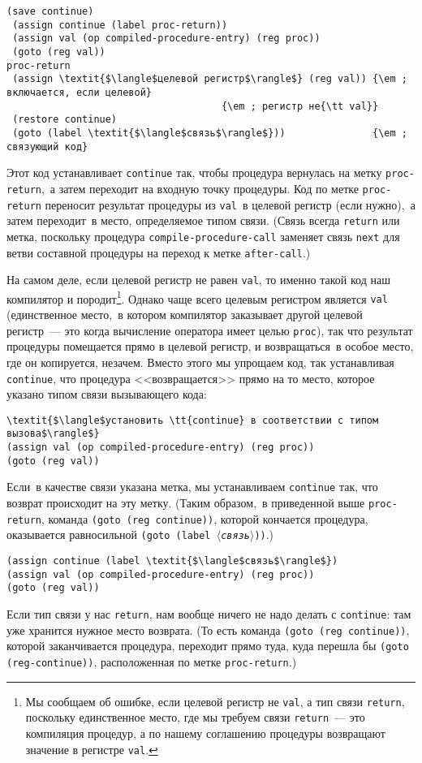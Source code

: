 \begin{Verbatim}[fontsize=\small]
 (save continue)
 (assign continue (label proc-return))
 (assign val (op compiled-procedure-entry) (reg proc))
 (goto (reg val))
proc-return
 (assign \textit{$\langle$целевой регистр$\rangle$} (reg val)) {\em ; включается, если целевой} 
                                     {\em ; регистр не{\tt val}}
 (restore continue)
 (goto (label \textit{$\langle$связь$\rangle$}))               {\em ; связующий код}
\end{Verbatim}
Этот код устанавливает {\tt continue} так, чтобы процедура
вернулась на метку {\tt proc-return},~а затем переходит на
входную точку процедуры.  Код по метке {\tt proc-return}
переносит результат процедуры из {\tt val}~в целевой регистр
(если нужно),~а затем переходит~в место, определяемое типом связи.
(Связь всегда {\tt return} или метка, поскольку процедура
{\tt compile-procedure-call} заменяет связь {\tt next}
для ветви составной процедуры на переход к метке
{\tt after-call}.)

На самом деле, если целевой регистр не равен
{\tt val}, то именно такой код наш компилятор и
породит\footnote{Мы сообщаем об ошибке, если целевой регистр не
{\tt val}, а тип связи {\tt return}, поскольку
единственное место, где мы требуем связи {\tt return}~--- это
компиляция процедур, а по нашему соглашению процедуры возвращают
значение в регистре {\tt val}.
}.
Однако чаще всего целевым регистром является {\tt val}
(единственное место,~в котором компилятор заказывает другой целевой
регистр~--- это когда вычисление оператора имеет целью
{\tt proc}), так что результат процедуры помещается прямо в
целевой регистр, и возвращаться~в особое место, где он копируется,
незачем.  Вместо этого мы упрощаем код, так устанавливая
{\tt continue}, что процедура <<возвращается>> прямо на то
место, которое указано типом связи вызывающего кода:

\begin{Verbatim}[fontsize=\small]
\textit{$\langle$установить \tt{continue} в соответствии с типом вызова$\rangle$}
(assign val (op compiled-procedure-entry) (reg proc))
(goto (reg val))
\end{Verbatim}
Если~в качестве связи указана метка, мы устанавливаем
{\tt continue} так, что возврат происходит на эту метку.
(Таким образом,~в приведенной выше {\tt proc-re\-turn}, команда
{\tt (goto (reg continue))}, которой
кончается процедура, оказывается равносильной {\tt (goto (label
\textit{$\langle$связь$\rangle$}))}.)

\begin{Verbatim}[fontsize=\small]
(assign continue (label \textit{$\langle$связь$\rangle$})
(assign val (op compiled-procedure-entry) (reg proc))
(goto (reg val))
\end{Verbatim}
Если тип связи у нас {\tt return}, нам вообще ничего не надо
делать с {\tt continue}: там уже хранится нужное место
возврата.  (То есть команда {\tt (goto (reg continue))},
которой заканчивается процедура, переходит прямо туда, куда перешла бы
{\tt (goto (reg-continue))}, расположенная по метке
{\tt proc-return}.)


